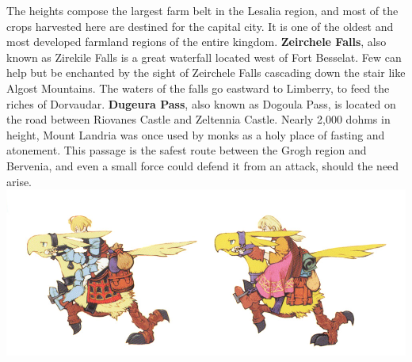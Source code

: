 The heights compose the largest farm belt in the Lesalia region, and most of the crops harvested here are destined for the capital city. 
It is one of the oldest and most developed farmland regions of the entire kingdom.
\textbf{Zeirchele Falls}, also known as Zirekile Falls is a great waterfall located west of Fort Besselat. Few can help but be enchanted by the sight of Zeirchele Falls cascading down the stair like Algost Mountains. 
The waters of the falls go eastward to Limberry, to feed the riches of Dorvaudar.
\textbf{Dugeura Pass}, also known as Dogoula Pass, is located on the road between Riovanes Castle and Zeltennia Castle. 
Nearly 2,000 dohms in height, Mount Landria was once used by monks as a holy place of fasting and atonement. 
This passage is the safest route between the Grogh region and Bervenia, and even a small force could defend it from an attack, should the need arise.
%
%
\clearpage
%
\onecolumn
%
\includegraphics[width=\textwidth]{./art/images/chocobos.jpg}
%
